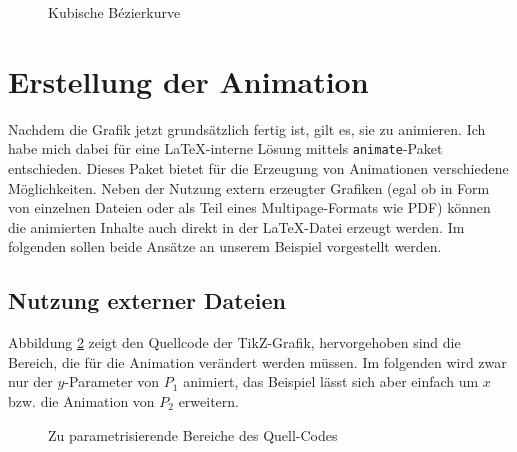 \documentclass[ngerman]{dtk}%
\begin{document}
\begin{figure}[h]
\centering
{}
\caption{Kubische Bézierkurve}\label{fig:beza}
\end{figure}\clearpage

\section{Erstellung der Animation}

Nachdem die Grafik jetzt grundsätzlich fertig ist, gilt es, sie zu animieren. Ich habe mich dabei für eine \LaTeX-interne Lösung mittels \texttt{animate}-Paket entschieden. Dieses Paket bietet für die Erzeugung von Animationen verschiedene Möglichkeiten. Neben der Nutzung extern erzeugter Grafiken (egal ob in Form von einzelnen Dateien oder als Teil eines Multipage-Formats wie PDF) können die animierten Inhalte auch direkt in der \LaTeX-Datei erzeugt werden. Im folgenden sollen beide Ansätze an unserem Beispiel vorgestellt werden.

\subsection{Nutzung externer Dateien}

Abbildung \ref{lis:paramcode} zeigt den Quellcode der TikZ-Grafik, hervorgehoben sind die Bereich, die für die Animation verändert werden müssen. Im folgenden wird zwar nur der $y$-Parameter von $P_1$ animiert, das Beispiel lässt sich aber einfach um $x$ bzw. die Animation von $P_2$ erweitern.

\begin{figure}[h]\centering
{}
\caption{Zu parametrisierende Bereiche des Quell-Codes}\label{lis:paramcode}
\end{figure}
\end{document}
